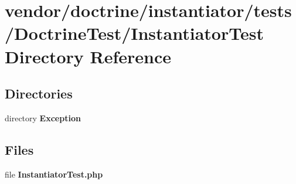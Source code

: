 \section{vendor/doctrine/instantiator/tests/\+Doctrine\+Test/\+Instantiator\+Test Directory Reference}
\label{dir_0b524d423ad22791f53747203e3f129e}
\subsection*{Directories}
\begin{DoxyCompactItemize}
\item 
directory {\bf Exception}
\end{DoxyCompactItemize}
\subsection*{Files}
\begin{DoxyCompactItemize}
\item 
file {\bf Instantiator\+Test.\+php}
\end{DoxyCompactItemize}
